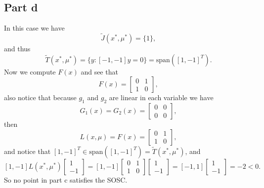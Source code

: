 \documentclass{article}
\begin{document}
\subsection*{Part d}
In this case we have
\[
	\tilde{J}(x^*,\mu^*)=\{1\},
\]
and thus
\[
	\tilde{T}(x^*,\mu^*)=\{y:[-1,-1]y=0\}=\text{span}([1,-1]^T).
\]
Now we compute $F(x)$ and see that
\[
	F(x)=\begin{bmatrix}
		0 & 1\\	
		1 & 0
	\end{bmatrix},
\]
also notice that because $g_1$ and $g_2$ are linear in each variable we have
\[
G_1(x)=G_2(x)=\begin{bmatrix}
	0 & 0\\	
	0 & 0
\end{bmatrix},
\]
then
\[
L(x,\mu)= F(x)=\begin{bmatrix}
		0 & 1\\	
		1 & 0
	\end{bmatrix},
\]
and notice that $[1,-1]^T\in\text{span}([1,-1]^T)=\tilde{T}(x^*,\mu^*)$, and
\[
	[1,-1]L(x^*,\mu^*)\begin{bmatrix}
1\\	
-1
\end{bmatrix}=
[1,-1]
\begin{bmatrix}
0 & 1\\	
1 & 0
\end{bmatrix}
\begin{bmatrix}
1\\	
-1
\end{bmatrix}=
[-1,1]\begin{bmatrix}
1\\	
-1
\end{bmatrix}=-2<0.
\]
So no point in part c satisfies the SOSC.
\end{document}
